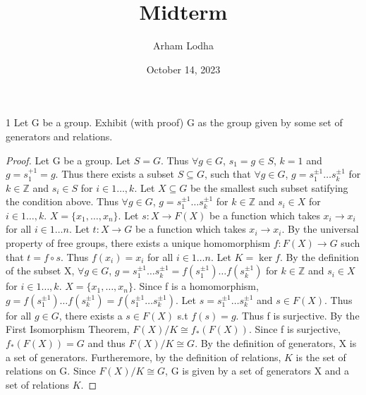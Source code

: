 \documentclass{article}
\newcommand{\Z}{\mathbb{Z}}
\begin{document}
\title{Midterm}
\author{Arham Lodha}%
\date{October 14, 2023}%
\maketitle

\begin{PROB}{1}\label{Problem 1.}
    Let G be a group. Exhibit (with proof) G as the group given by some set of generators and relations.
\end{PROB}
\begin{proof}
    Let G be a group. Let $S = G$. Thus $\forall g \in G$, $s_1 = g \in S$, $k = 1$ and $g = s_1^{+1} = g$. Thus there exists a subset $S \subseteq G$, such that $\forall g \in G$, $g = s_1^{\pm1}\ldots s_k^{\pm 1}$ for $k \in \Z$ and $s_i \in S$ for $i \in 1 \ldots, k$. Let $X \subseteq G$ be the smallest such subset satifying the condition above. Thus $\forall g \in G$, $g = s_1^{\pm1}\ldots s_k^{\pm 1}$ for $k \in \Z$ and $s_i \in X$ for $i \in 1 \ldots, k$. $X = \{x_1, \ldots, x_n\}$. Let $s: X \to F(X)$ be a function which takes $x_i \to x_i$ for all $i \in 1 \ldots n$. Let $t: X \to G$ be a function which takes $x_i \to x_i$. By the universal property of free groups, there exists a unique homomorphism $f: F(X) \to G$ such that $t = f \circ s$. Thus $f(x_i) = x_i$ for all $i \in 1 \ldots n$. Let $K = \ker f$. By the definition of the subset X, $\forall g \in G$, $g = s_1^{\pm1}\ldots s_k^{\pm 1} = f(s_1^{\pm1})\ldots f(s_k^{\pm 1})$ for $k \in \Z$ and $s_i \in X$ for $i \in 1 \ldots, k$. $X = \{x_1, \ldots, x_n\}$. Since f is a homomorphism, $g = f(s_1^{\pm1})\ldots f(s_k^{\pm 1}) = f(s_1^{\pm 1}\ldots s_k^{\pm 1})$. Let $s = s_1^{\pm 1}\ldots s_k^{\pm 1}$ and $s \in F(X)$. Thus for all $g \in G$, there exists a $s \in F(X)$ s.t $f(s) = g$. Thus f is surjective. By the First Isomorphism Theorem, $F(X)/K \cong f_*(F(X))$. Since f is surjective, $f_*(F(X)) = G$ and thus $F(X)/K \cong G$. By the definition of generators, X is a set of generators. Furtheremore, by the definition of relations, $K$ is the set of relations on G. Since $F(X)/K \cong G$, G is given by a set of generators X and a set of relations $K$.
\end{proof}

\bigskip
\end{document}
